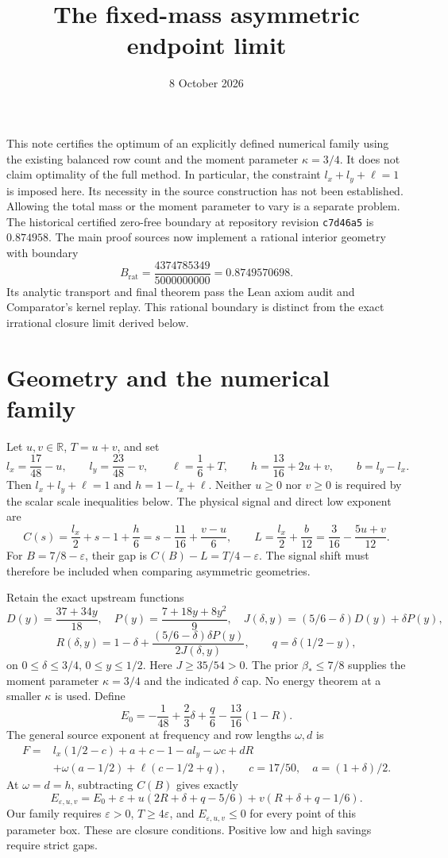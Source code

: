 \documentclass[11pt]{article}
\title{The fixed-mass asymmetric endpoint limit}
\author{}
\date{8 October 2026}
\newcommand{\eps}{\varepsilon}
\begin{document}
\maketitle

This note certifies the optimum of an explicitly defined numerical family
using the existing balanced row count and the moment parameter
$\kappa=3/4$. It does not claim optimality of the full method. In
particular, the constraint $l_x+l_y+\ell=1$ is imposed here. Its necessity
in the source construction has not been established. Allowing the total
mass or the moment parameter to vary is a separate problem.
The historical certified zero-free boundary at repository revision
\texttt{c7d46a5} is $0.874958$. The main proof sources now implement a
rational interior geometry with boundary
\[
 B_{\mathrm{rat}}=\frac{4374785349}{5000000000}=0.8749570698.
\]
Its analytic transport and final theorem pass the Lean axiom audit and
Comparator's kernel replay. This rational boundary is distinct
from the exact irrational closure limit derived below.

\section{Geometry and the numerical family}

Let $u,v\in\mathbb R$, $T=u+v$, and set
\[
 l_x=\frac{17}{48}-u,\qquad l_y=\frac{23}{48}-v,\qquad
 \ell=\frac16+T,\qquad h=\frac{13}{16}+2u+v,\qquad b=l_y-l_x.
\]
Then $l_x+l_y+\ell=1$ and $h=1-l_x+\ell$. Neither $u\ge0$ nor
$v\ge0$ is required by the scalar scale inequalities below. The physical
signal and direct low exponent are
\[
 C(s)=\frac{l_x}{2}+s-1+\frac h6
     =s-\frac{11}{16}+\frac{v-u}{6},\qquad
 L=\frac{l_x}{2}+\frac b{12}
     =\frac3{16}-\frac{5u+v}{12}.
\]
For $B=7/8-\eps$, their gap is $C(B)-L=T/4-\eps$.
The signal shift must therefore be included when comparing asymmetric
geometries.

Retain the exact upstream functions
\[
 D(y)=\frac{37+34y}{18},\quad P(y)=\frac{7+18y+8y^2}{9},\quad
 J(\delta,y)=(5/6-\delta)D(y)+\delta P(y),
\]
\[
 R(\delta,y)=1-\delta+
       \frac{(5/6-\delta)\delta P(y)}{2J(\delta,y)},\qquad
 q=\delta(1/2-y),
\]
on $0\le\delta\le3/4$, $0\le y\le1/2$. Here $J\ge35/54>0$.
The prior $\beta_*\le7/8$ supplies the moment parameter $\kappa=3/4$
and the indicated $\delta$ cap. No energy theorem at a smaller
$\kappa$ is used.
Define
\[
 E_0=-\frac1{48}+\frac23\delta+\frac q6-\frac{13}{16}(1-R).
\]
The general source exponent at frequency and row lengths $\omega,d$ is
\begin{align*}
 F={}&l_x(1/2-c)+a+c-1-a l_y-\omega c+dR\\
 &+\omega(a-1/2)+\ell(c-1/2+q),\qquad
 c=17/50,\quad a=(1+\delta)/2.
\end{align*}
At $\omega=d=h$, subtracting $C(B)$ gives exactly
\[
 E_{\eps,u,v}=E_0+\eps+
 u(2R+\delta+q-5/6)+v(R+\delta+q-1/6).
\]
Our family requires $\eps>0$, $T\ge4\eps$, and
$E_{\eps,u,v}\le0$ for every point of this parameter box. These are
closure conditions. Positive low and high savings require strict gaps.
\end{document}
